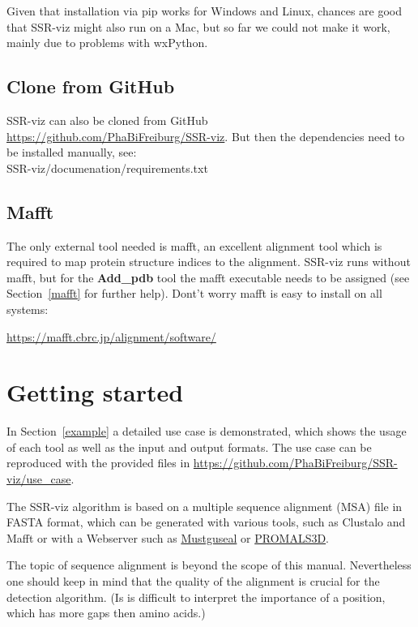 \documentclass[a4paper,10pt]{article}
\begin{document}
Given that installation via pip works for Windows and Linux, chances are good
that SSR-viz might also run on a Mac, but so far we could not make it work,
mainly due to problems with wxPython.

\subsection{Clone from GitHub}

SSR-viz can also be cloned from GitHub \url{https://github.com/PhaBiFreiburg/SSR-viz}.
But then the dependencies need to be installed manually, 
see: \\
SSR-viz/documenation/requirements.txt

\subsection{Mafft}

The only external tool needed is mafft, an excellent alignment tool which is 
required to map protein structure indices to the alignment. SSR-viz runs
without mafft, but for the \textbf{Add\_pdb} tool the mafft executable needs 
to be assigned (see Section~\ref{mafft} for further help).
Dont't worry mafft is easy to install on all systems:

\url{https://mafft.cbrc.jp/alignment/software/}

\section{Getting started}

In Section~\ref{example} a detailed use case is demonstrated, which shows
the usage of each tool as well as the input and output formats.
The use case can be reproduced with the provided files in
 \url{https://github.com/PhaBiFreiburg/SSR-viz/use_case}.

The SSR-viz algorithm is based on a multiple sequence alignment (MSA) file in 
FASTA format, which can be generated with various tools, such as Clustalo 
and Mafft or with a Webserver such as 
\href{https://zeus.cmm.msu.ru/#scenario=2}{Mustguseal} or 
\href{http://prodata.swmed.edu/promals3d/promals3d.php}{PROMALS3D}.

The topic of sequence alignment is beyond the scope of this manual.  
Nevertheless one should keep in mind that 
the quality of the alignment is crucial for the detection algorithm.
(Is is difficult to interpret the importance of a position, which has
more gaps then amino acids.)
\end{document}
